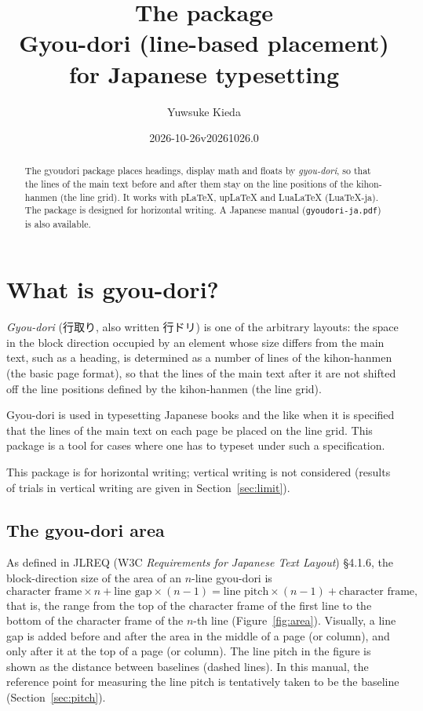 \documentclass[paper=a4,dvipdfmx]{jlreq}
\title{The \pkg{gyoudori} package\\[.5ex]\large Gyou-dori (line-based placement)
  for Japanese typesetting}
\author{Yuwsuke Kieda}
\date{2026-10-26\quad v20261026.0}
\newcommand\pkg[1]{\textsf{#1}}
\begin{document}
\maketitle

\begin{abstract}
The \pkg{gyoudori} package places headings, display math and floats by
\emph{gyou-dori}, so that the lines of the main text before and after them stay
on the line positions of the kihon-hanmen (the line grid). It works with pLaTeX,
upLaTeX and LuaLaTeX (LuaTeX-ja). The package is designed for horizontal writing.
A Japanese manual (\texttt{gyoudori-ja.pdf})
is also available.
\end{abstract}

\section{What is gyou-dori?}

\emph{Gyou-dori} (行取り, also written 行ドリ) is one of the arbitrary layouts: the
space in the block direction occupied by an element whose size differs from the
main text, such as a heading, is determined as a number of lines of the
kihon-hanmen (the basic page format), so that the lines of the main text after
it are not shifted off the line positions defined by the kihon-hanmen (the line
grid).

Gyou-dori is used in typesetting Japanese books and the like when it is
specified that the lines of the main text on each page be placed on the line
grid. This package is a tool for cases where one has to typeset under such a
specification.

This package is for horizontal writing; vertical writing is not considered
(results of trials in vertical writing are given in Section~\ref{sec:limit}).

\subsection{The gyou-dori area}

As defined in JLREQ (W3C \textit{Requirements for Japanese Text Layout})
\S4.1.6, the block-direction size of the area of an
$n$-line gyou-dori is
\[
  \text{character frame}\times n + \text{line gap}\times(n-1)
  = \text{line pitch}\times(n-1) + \text{character frame},
\]
that is, the range from the top of the character frame of the first line to the
bottom of the character frame of the $n$-th line (Figure~\ref{fig:area}).
Visually, a line gap is added before and after the area in the middle of a page
(or column), and only after it at the top of a page (or column).
The line pitch in the figure is shown as the distance between baselines (dashed
lines). In this manual, the reference point for measuring the line pitch is
tentatively taken to be the baseline (Section~\ref{sec:pitch}).
\end{document}
